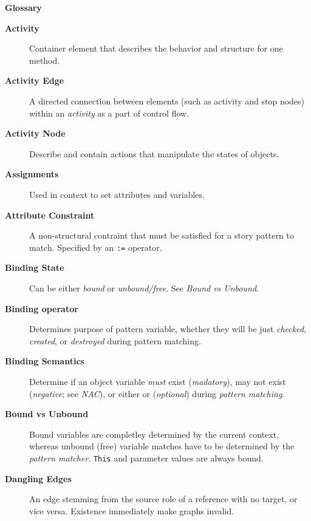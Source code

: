 \newpage
{}
{}
\hypertarget{glossary}{}

\vspace{1cm}
{\Huge \bf Glossary}
\vspace{1cm}

\begin{description}

\item[\bf Activity]
Container element that describes the behavior and structure for one method.

\item[\bf Activity Edge]
A directed connection between elements (such as activity and stop nodes) within an \emph{activity} as a part of control flow.

\item[\bf Activity Node]
Describe and contain actions that manipulate the states of objects.

\item[\bf Assignments]
Used in context to set attributes and variables.

\item[\bf Attribute Constraint]
A non-structural contraint that must be satisfied for a story pattern to match. Specified by an \texttt{:=} operator.

\item[\bf Binding State]
Can be either \emph{bound} or \emph{unbound/free}. See \emph{Bound vs Unbound}.

\item[\bf Binding operator]
Determines purpose of pattern variable, whether they will be just \emph{checked}, \emph{created}, or \emph{destroyed} during pattern matching.

\item[\bf Binding Semantics]
Determine if an object variable \emph{must} exist (\emph{madatory}), may not exist (\emph{negative}; see \emph{NAC}), or either or (\emph{optional}) during
\emph{pattern matching}.

\item[\bf Bound vs Unbound]
Bound variables are completley determined by the current context, whereas unbound (free) variable matches have to be determined by the \emph{pattern matcher}.
\texttt{This} and parameter values are always bound.

\item[\bf Dangling Edges]
An edge stemming from the source role of a reference with no target, or vice versa. Existence immediately make graphs invalid.


\end{description}
